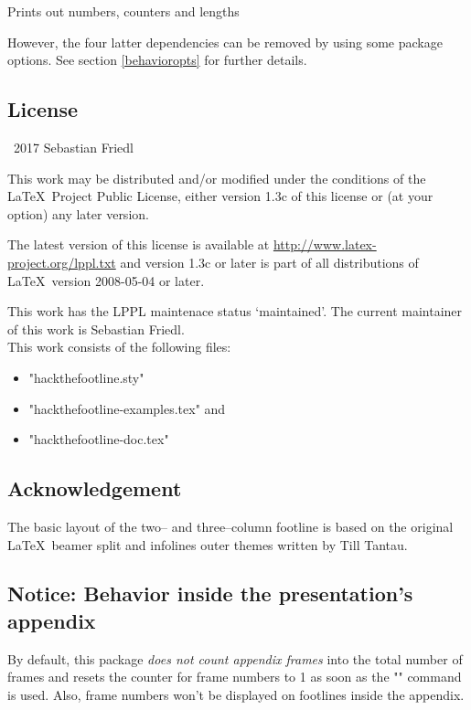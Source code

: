 \documentclass[11pt]{ltxdoc}
\begin{document}
	\medskip
	Prints out numbers, counters and lengths
	
	\bigskip
	However, the four latter dependencies can be removed by using some package options. See section \ref{behavioropts} for further details.
	
	
	\subsection*{License}
	\textcopyright\ 2017 Sebastian Friedl
	
	\smallskip
	This work may be distributed and/or modified under the conditions of the \LaTeX\ Project Public License, either version 1.3c of this license or (at your option) any later version.
	
	\smallskip
	The latest version of this license is available at \url{http://www.latex-project.org/lppl.txt} and version 1.3c or later is part of all distributions of \LaTeX\ version 2008-05-04 or later.
	
	\smallskip
	This work has the LPPL maintenace status \enquote*{maintained}. The current maintainer of this work is Sebastian Friedl. \\
	This work consists of the following files:
	\begin{itemize} \itemsep 0pt
		\item "hackthefootline.sty"
		\item "hackthefootline-examples.tex" and
		\item "hackthefootline-doc.tex"
	\end{itemize}
	
	
	\subsection*{Acknowledgement}
	The basic layout of the two-- and three--column footline is based on the original \LaTeX\ beamer split and infolines outer themes written by Till Tantau.
	
	
	\subsection*{Notice: Behavior inside the presentation's appendix}
	By default, this package \emph{does not count appendix frames} into the total number of frames and resets the counter for frame numbers to 1 as soon as the "\appendix" command is used. Also, frame numbers won't be displayed on footlines inside the appendix.
	
\end{document}
